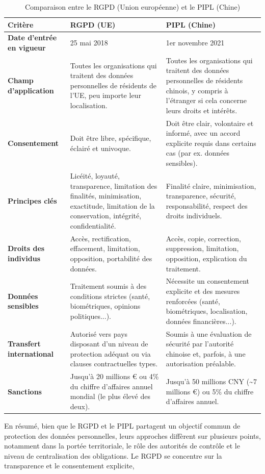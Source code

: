 \begin{table}[H]
\centering
\caption{Comparaison entre le RGPD (Union européenne) et le PIPL (Chine)}
\begin{tabular}{|p{4cm}|p{5cm}|p{5cm}|}
\hline
\textbf{Critère} & \textbf{RGPD (UE)} & \textbf{PIPL (Chine)} \\ \hline
\textbf{Date d'entrée en vigueur} & 25 mai 2018 & 1er novembre 2021 \\ \hline
\textbf{Champ d'application} & Toutes les organisations qui traitent des données personnelles de résidents de l’UE, peu importe leur localisation. & Toutes les organisations qui traitent des données personnelles de résidents chinois, y compris à l’étranger si cela concerne leurs droits et intérêts. \\ \hline
\textbf{Consentement} & Doit être libre, spécifique, éclairé et univoque. & Doit être clair, volontaire et informé, avec un accord explicite requis dans certains cas (par ex. données sensibles). \\ \hline
\textbf{Principes clés} & Licéité, loyauté, transparence, limitation des finalités, minimisation, exactitude, limitation de la conservation, intégrité, confidentialité. & Finalité claire, minimisation, transparence, sécurité, responsabilité, respect des droits individuels. \\ \hline
\textbf{Droits des individus} & Accès, rectification, effacement, limitation, opposition, portabilité des données. & Accès, copie, correction, suppression, limitation, opposition, explication du traitement. \\ \hline
\textbf{Données sensibles} & Traitement soumis à des conditions strictes (santé, biométriques, opinions politiques...). & Nécessite un consentement explicite et des mesures renforcées (santé, biométriques, localisation, données financières...). \\ \hline
\textbf{Transfert international} & Autorisé vers pays disposant d’un niveau de protection adéquat ou via clauses contractuelles types. & Soumis à une évaluation de sécurité par l'autorité chinoise et, parfois, à une autorisation préalable. \\ \hline
\textbf{Sanctions} & Jusqu’à 20 millions € ou 4\% du chiffre d’affaires annuel mondial (le plus élevé des deux). & Jusqu’à 50 millions CNY (\textasciitilde 7 millions €) ou 5\% du chiffre d’affaires annuel. \\ \hline
\end{tabular}
\end{table}
En résumé, bien que le RGPD et le PIPL partagent un objectif commun de protection des données personnelles, leurs approches diffèrent sur plusieurs points, notamment dans la portée territoriale, le rôle des autorités de contrôle et le niveau de centralisation des obligations. Le RGPD se concentre sur la transparence et le consentement explicite, 
